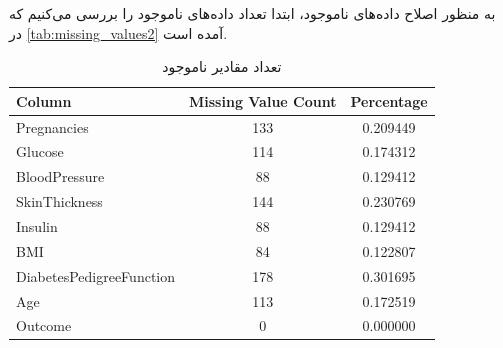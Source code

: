 \documentclass[11pt]{article}
\begin{document}
	به منظور اصلاح داده‌های ناموجود، ابتدا تعداد داده‌های ناموجود را بررسی می‌کنیم که در 
	\autoref{tab:missing_values2}
	آمده‌ است.
	\begin{table}[h!]
				\centering
		\caption{تعداد مقادیر ناموجود}
		\begin{latin}
		{\scriptsize
		\begin{tabular}{lcc}
			\toprule
			Column                     & Missing Value Count & Percentage     \\ 
			\midrule
			Pregnancies                & 133            & 0.209449  \\ 
			Glucose                    & 114            & 0.174312  \\ 
			BloodPressure              & 88             & 0.129412  \\ 
			SkinThickness              & 144            & 0.230769  \\ 
			Insulin                    & 88             & 0.129412  \\ 
			BMI                        & 84             & 0.122807  \\ 
			DiabetesPedigreeFunction   & 178            & 0.301695  \\ 
			Age                        & 113            & 0.172519  \\ 
			Outcome                    & 0               & 0.000000  \\ 
			\bottomrule
		\end{tabular}
		}
		\end{latin}
		\label{tab:missing_values2}
	\end{table}
	
\end{document}
